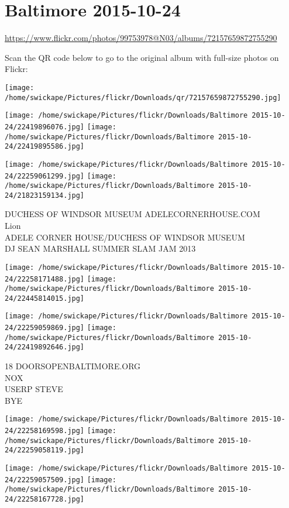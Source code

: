 \documentclass[10pt,letterpaper]{article}
\title{}
\author{}
\date{}
\begin{document}
\section*{Baltimore 2015-10-24}

\url{https://www.flickr.com/photos/99753978@N03/albums/72157659872755290}

Scan the QR code below to go to the original album with full-size photos on Flickr:

\texttt{[image: /home/swickape/Pictures/flickr/Downloads/qr/72157659872755290.jpg]}
\pagebreak

\texttt{[image: /home/swickape/Pictures/flickr/Downloads/Baltimore 2015-10-24/22419896076.jpg]}
\texttt{[image: /home/swickape/Pictures/flickr/Downloads/Baltimore 2015-10-24/22419895586.jpg]}

\texttt{[image: /home/swickape/Pictures/flickr/Downloads/Baltimore 2015-10-24/22259061299.jpg]}
\texttt{[image: /home/swickape/Pictures/flickr/Downloads/Baltimore 2015-10-24/21823159134.jpg]}

DUCHESS OF WINDSOR MUSEUM ADELECORNERHOUSE.COM\\
Lion\\
ADELE CORNER HOUSE/DUCHESS OF WINDSOR MUSEUM\\
DJ SEAN MARSHALL SUMMER SLAM JAM 2013
\pagebreak

\texttt{[image: /home/swickape/Pictures/flickr/Downloads/Baltimore 2015-10-24/22258171488.jpg]}
\texttt{[image: /home/swickape/Pictures/flickr/Downloads/Baltimore 2015-10-24/22445814015.jpg]}

\texttt{[image: /home/swickape/Pictures/flickr/Downloads/Baltimore 2015-10-24/22259059869.jpg]}
\texttt{[image: /home/swickape/Pictures/flickr/Downloads/Baltimore 2015-10-24/22419892646.jpg]}

18 DOORSOPENBALTIMORE.ORG\\
NOX\\
USERP STEVE\\
BYE
\pagebreak

\texttt{[image: /home/swickape/Pictures/flickr/Downloads/Baltimore 2015-10-24/22258169598.jpg]}
\texttt{[image: /home/swickape/Pictures/flickr/Downloads/Baltimore 2015-10-24/22259058119.jpg]}

\texttt{[image: /home/swickape/Pictures/flickr/Downloads/Baltimore 2015-10-24/22259057509.jpg]}
\texttt{[image: /home/swickape/Pictures/flickr/Downloads/Baltimore 2015-10-24/22258167728.jpg]}
\end{document}
